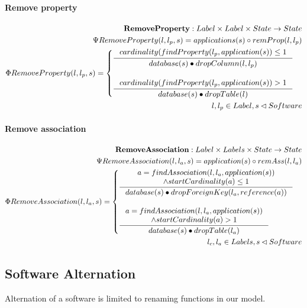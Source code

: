 \documentclass[11pt]{article}
\begin{document}
\paragraph{Remove property}
\begin{align*}
	\mathbf{RemoveProperty} : Label \times Label \times State \rightarrow State \\
	\Psi RemoveProperty(l, l_p, s) =  applications(s) \circ  remProp(l, l_p) \\
	\Phi RemoveProperty(l, l_p, s) = \begin{cases}
		 \inference{cardinality(findProperty(l_p, application(s)) \leq 1}{database(s) \bullet dropColumn(l, l_p)}  \\\\
		 \inference{cardinality(findProperty(l_p, application(s)) >1}{database(s) \bullet dropTable(l)}
 	\end{cases}\\
 	l, l_p \in Label, s \lhd Software
\end{align*}
\paragraph{Remove association} 
\begin{align*}
    \mathbf{RemoveAssociation} : Label \times Labels \times State \rightarrow State \\ 
    \Psi RemoveAssociation(l, l_a, s) = application(s) \circ remAss(l, l_a) \\
    \Phi RemoveAssociation(l, l_a, s) = \begin{cases}
     	\inference{a = findAssociation(l, l_a, application(s)) \\ \wedge startCardinality(a) \leq 1 \\}{database(s) \bullet dropForeignKey(l_a, reference(a))} \\\\
     	\inference{a = findAssociation(l, l_a, application(s)) \\ \wedge startCardinality(a) > 1}{database(s) \bullet dropTable(l_a)} 
     \end{cases}\\
    l_c, l_a \in Labels, s \lhd Software
\end{align*}


\subsection{Software Alternation}
Alternation of a software is limited to renaming functions in our model.
\end{document}
